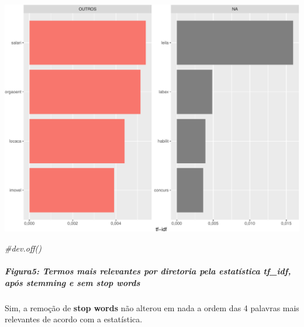 \documentclass[]{article}
\newenvironment{Shaded}{\begin{snugshade}}{\end{snugshade}}
\newcommand{\CommentTok}[1]{\textcolor[rgb]{0.56,0.35,0.01}{\textit{#1}}}
\let\oldsubparagraph\subparagraph
\renewcommand{\subparagraph}[1]{\oldsubparagraph{#1}\mbox{}}
\begin{document}
\includegraphics{markdown_v50_files/figure-latex/unnamed-chunk-71-1.pdf}

\begin{Shaded}
\begin{Highlighting}[]
\CommentTok{#dev.off()}
\end{Highlighting}
\end{Shaded}

\hypertarget{figura5-termos-mais-relevantes-por-diretoria-pela-estatistica-tf_idf-apos-stemming-e-sem-stop-words}{%
\subparagraph{\texorpdfstring{Figura5: Termos mais relevantes por
diretoria pela estatística \textbf{tf\_idf}, após \textbf{stemming} e
sem \textbf{stop
words}}{Figura5: Termos mais relevantes por diretoria pela estatística tf\_idf, após stemming e sem stop words}}\label{figura5-termos-mais-relevantes-por-diretoria-pela-estatistica-tf_idf-apos-stemming-e-sem-stop-words}}

Sim, a remoção de \textbf{stop words} não alterou em nada a ordem das 4
palavras mais relevantes de acordo com a estatística.
\end{document}
